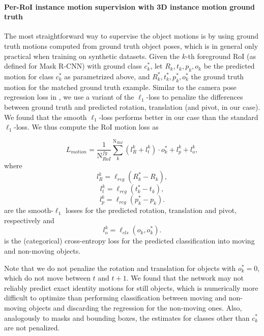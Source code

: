 \paragraph{Per-RoI instance motion supervision with 3D instance motion ground truth}
The most straightforward way to supervise the object motions is by using ground truth
motions computed from ground truth object poses, which is in general
only practical when training on synthetic datasets.
Given the $k$-th foreground RoI (as defined for Mask R-CNN) with ground class $c_k^*$,
let $R_k, t_k, p_k, o_k$ be the predicted motion for class $c_k^*$ as parametrized above,
and $R_k^*, t_k^*, p_k^*, o_k^*$ the ground truth motion for the matched ground truth example.
Similar to the camera pose regression loss in \cite{PoseNet2},
we use a variant of the $\ell_1$-loss to penalize the differences between ground truth and predicted
rotation, translation (and pivot, in our case). We found that the smooth $\ell_1$-loss
performs better in our case than the standard $\ell_1$-loss.
We thus compute the RoI motion loss as

\begin{equation}
L_{motion} = \frac{1}{\text{N}_{RoI}^{\mathit{fg}}} \sum_k^{\text{N}_{RoI}} (l_{R}^k + l_{t}^k) \cdot o_k^* + l_{p}^k + l_o^k,
\end{equation}
where
\begin{equation}
l_{R}^k = \ell_{reg} (R_k^* - R_k),
\end{equation}
\begin{equation}
l_{t}^k = \ell_{reg} (t_k^* - t_k),
\end{equation}
\begin{equation}
l_{p}^k = \ell_{reg} (p_k^* - p_k).
\end{equation}
are the smooth-$\ell_1$ losses for the predicted rotation, translation and pivot,
respectively and
\begin{equation}
l_o^k = \ell_{cls}(o_k, o_k^*).
\end{equation}
is the (categorical) cross-entropy loss for the predicted classification into moving and non-moving objects.

Note that we do not penalize the rotation and translation for objects with
$o_k^* = 0$, which do not move between $t$ and $t+1$. We found that the network
may not reliably predict exact identity motions for still objects, which is
numerically more difficult to optimize than performing classification between
moving and non-moving objects and discarding the regression for the non-moving
ones. Also, analogously to masks and bounding boxes, the estimates for classes
other than $c_k^*$ are not penalized.

